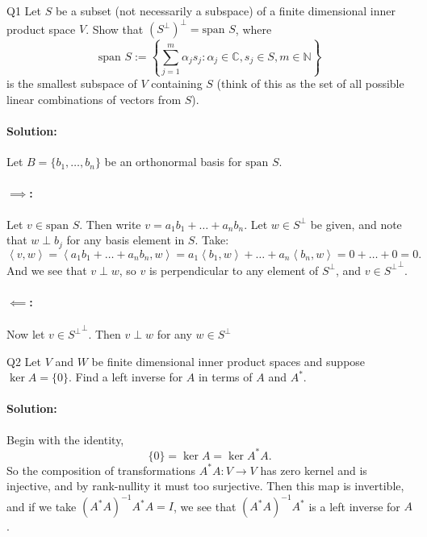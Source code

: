 \documentclass{article}
\begin{document}
\begin{prob}{Q1}
Let $S$ be a subset (not necessarily a subspace) of a finite dimensional inner product space $V$. Show that $(S^\perp)^\perp = \text{span } S$, where
$$\text{span } S := \left\{\sum_{j=1}^m \alpha_j s_j : \alpha_j \in \mathbb{C}, s_j \in S, m \in \mathbb{N}\right\}$$
is the smallest subspace of $V$ containing $S$ (think of this as the set of all possible linear combinations of vectors from $S$).
\end{prob}
\paragraph{Solution: }Let $B=\{b_1,\ldots,b_n\} $ be an orthonormal basis for $\text{span } S$.

\paragraph{$\implies$:} Let $v\in \text{span }S$. Then write $v=a_1b_1+\ldots+a_nb_n$. Let $w\in S^{\perp}$ be given, and note that $w\perp b_j$ for any basis element in $S$. Take:
\[ \left<v,w \right> =  \left< a_1b_1+\ldots+a_nb_n,w\right> = a_1\left< b_1,w\right>+\ldots+a_n\left<b_n ,w\right> =  0+\ldots+0=0 .\] 
And we see that $v\perp w$, so $v$ is perpendicular to any element of $S^{\perp}$, and $v\in {S^{\perp}}^{\perp}$.
\paragraph{$\impliedby$:} Now let $v\in {S^{\perp}}^{\perp}$. Then $v\perp w$ for any $w\in S^{\perp}$

\begin{prob}{Q2}
Let $V$ and $W$ be finite dimensional inner product spaces and suppose $\ker A = \{0\}$. Find a left inverse for $A$ in terms of $A$ and $A^*$.
\end{prob}

\paragraph{Solution: } Begin with the identity,
\[ \{0\} =\ker A =\ker A^* A .\] 
So the composition of transformations $A^* A:V\to V$ has zero kernel and is injective, and by rank-nullity it must too surjective. Then this map is invertible, and if we take $(A^* A)^{-1}A^* A=I$, we see that $(A^* A)^{-1}A^* $ is a left inverse for $A$.
\end{document}
